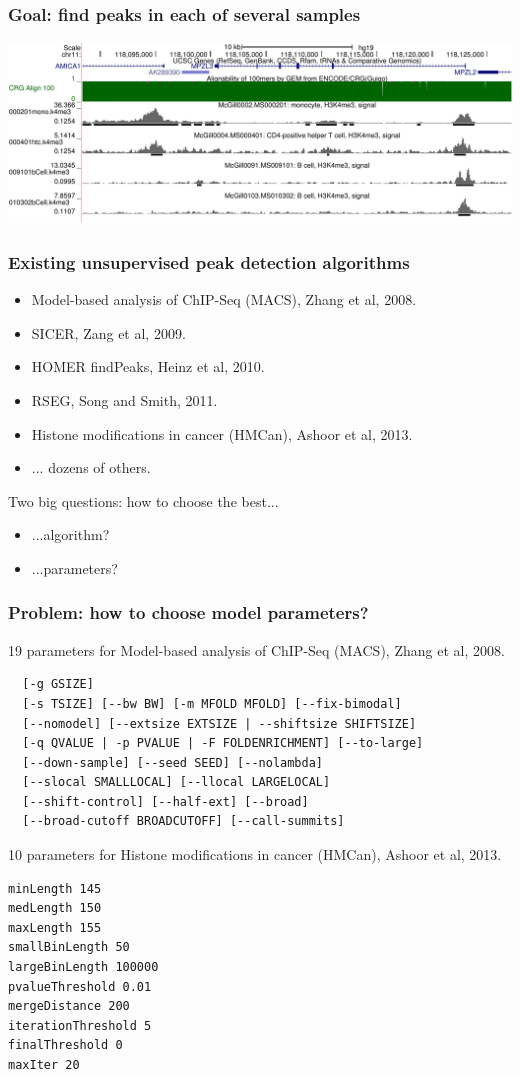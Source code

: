 \documentclass{beamer}
\begin{document}
\begin{frame}
  \frametitle{Goal: find peaks in each of several samples}
  \includegraphics[width=\textwidth]{screenshot-ucsc-edited}
\end{frame}

\begin{frame}
  \frametitle{Existing unsupervised peak detection algorithms}
  \begin{itemize}
  \item Model-based analysis of ChIP-Seq (MACS), Zhang et al, 2008.
  \item SICER, Zang et al, 2009.
  \item HOMER findPeaks, Heinz et al, 2010.
  \item RSEG, Song and Smith, 2011.
  \item Histone modifications in cancer (HMCan), Ashoor et al, 2013.
  \item ... dozens of others.
  \end{itemize}
  Two big questions: how to choose the best...
  \begin{itemize}
  \item ...algorithm?
  \item ...parameters?
  \end{itemize}
\end{frame}

\begin{frame}[fragile]
  \frametitle{Problem: how to choose model parameters?}
\scriptsize
19 parameters for Model-based analysis of ChIP-Seq (MACS), Zhang et al, 2008.
\begin{verbatim}
  [-g GSIZE]
  [-s TSIZE] [--bw BW] [-m MFOLD MFOLD] [--fix-bimodal]
  [--nomodel] [--extsize EXTSIZE | --shiftsize SHIFTSIZE]
  [-q QVALUE | -p PVALUE | -F FOLDENRICHMENT] [--to-large]
  [--down-sample] [--seed SEED] [--nolambda]
  [--slocal SMALLLOCAL] [--llocal LARGELOCAL]
  [--shift-control] [--half-ext] [--broad]
  [--broad-cutoff BROADCUTOFF] [--call-summits]
\end{verbatim}
10 parameters for Histone modifications in cancer (HMCan),
Ashoor et al, 2013.
\begin{verbatim}
minLength 145
medLength 150
maxLength 155
smallBinLength 50
largeBinLength 100000
pvalueThreshold 0.01
mergeDistance 200
iterationThreshold 5
finalThreshold 0
maxIter 20
\end{verbatim}
\end{frame}
\end{document}
